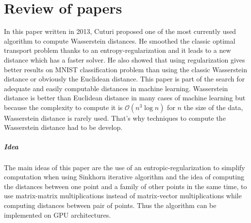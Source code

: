 \chapter{Review of papers}

\myminitoc


In this paper written in 2013, Cuturi proposed one of the most currently used algorithm to compute Wasserstein distances. He smoothed the classic optimal transport problem thanks to an entropy-regularization and it leads to a new distance which has a faster solver. He also showed that using regularization gives better results on MNIST classification problem than using the classic Wasserstein distance or obviously the Euclidean distance. This paper is part of the search for adequate and easily computable distances in machine learning. Wasserstein distance is better than Euclidean distance in many cases of machine learning but because the complexity to compute it is $\mathcal{O}(n^3 \log n)$ for $n$ the size of the data, Wasserstein distance is rarely used. That's why techniques to compute the Wasserstein distance had to be develop.

\paragraph{Idea}
The main ideas of this paper are the use of an entropic-regularization to simplify computation when using Sinkhorn iterative algorithm and the idea of computing the distances between one point and a family of other points in the same time, to use matrix-matrix multiplications instead of matrix-vector multiplications while computing distances between pair of points. Thus the algorithm can be implemented on GPU architectures.

